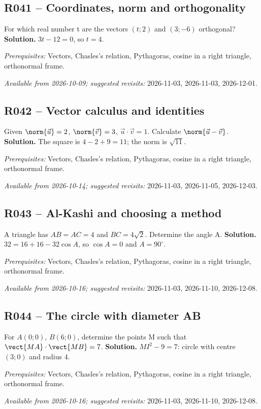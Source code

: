 \subsection*{R041 -- Coordinates, norm and orthogonality}\label{R041}
For which real number t are the vectors $(t;2)$ and $(3;-6)$ orthogonal?
\ifprof\textbf{Solution.} $3t-12=0$, so $t=4$.\par\textit{Prerequisites:} Vectors, Chasles's relation, Pythagoras, cosine in a right triangle, orthonormal frame.\par\textit{Available from 2026-10-09; suggested revisits:} 2026-11-03, 2026-11-03, 2026-12-01.\fi
{}\subsection*{R042 -- Vector calculus and identities}\label{R042}
Given $\norm{\vec u}=2$, $\norm{\vec v}=3$, $\vec u\cdot\vec v=1$. Calculate $\norm{\vec u-\vec v}$.
\ifprof\textbf{Solution.} The square is $4-2+9=11$; the norm is $\sqrt{11}$.\par\textit{Prerequisites:} Vectors, Chasles's relation, Pythagoras, cosine in a right triangle, orthonormal frame.\par\textit{Available from 2026-10-14; suggested revisits:} 2026-11-03, 2026-11-05, 2026-12-03.\fi
{}\subsection*{R043 -- Al-Kashi and choosing a method}\label{R043}
A triangle has $AB=AC=4$ and $BC=4\sqrt2$. Determine the angle A.
\ifprof\textbf{Solution.} $32=16+16-32\cos A$, so $\cos A=0$ and $A=90^\circ$.\par\textit{Prerequisites:} Vectors, Chasles's relation, Pythagoras, cosine in a right triangle, orthonormal frame.\par\textit{Available from 2026-10-16; suggested revisits:} 2026-11-03, 2026-11-10, 2026-12-08.\fi
{}\subsection*{R044 -- The circle with diameter AB}\label{R044}
For $A(0;0)$, $B(6;0)$, determine the points M such that $\vect{MA}\cdot\vect{MB}=7$.
\ifprof\textbf{Solution.} $MI^2-9=7$: circle with centre $(3;0)$ and radius 4.\par\textit{Prerequisites:} Vectors, Chasles's relation, Pythagoras, cosine in a right triangle, orthonormal frame.\par\textit{Available from 2026-10-16; suggested revisits:} 2026-11-03, 2026-11-10, 2026-12-08.\fi

